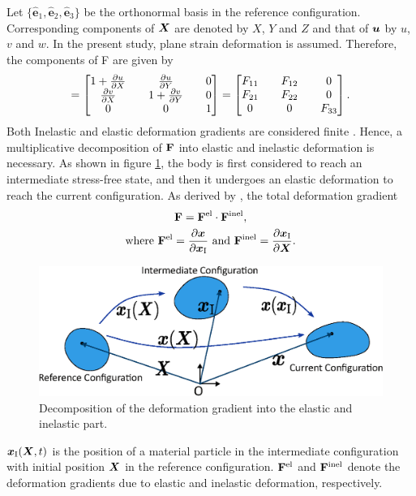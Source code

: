 Let $\{\hat{\bm{e}}_1, \hat{\bm{e}}_2, \hat{\bm{e}}_3\}$ be the orthonormal basis in the reference configuration. Corresponding components of ${\bm{X}}$ are denoted by $X$, $Y$ and $Z$ and that of ${\bm{u}}$ by $u$, $v$ and $w$. In the present study, plane strain deformation is assumed. Therefore, the components of F are given by \citep{2009ContMechLai} 
\begin{align}
[\F] = 
\begin{bmatrix}
       1 + \pdiff{u}{X} && \pdiff{u}{Y} && 0 \\
       \pdiff{v}{X} && 1 + \pdiff{v}{Y} && 0 \\
       0 && 0 && 1
\end{bmatrix} = \tensor{F}. \label{eq:F_tensor}
\end{align}
Both Inelastic and elastic deformation gradients are considered finite \citep{2011JMPSBower}. Hence, a multiplicative decomposition of $\mathbf{F}$ into elastic and inelastic deformation is necessary. As shown in figure \ref{fig:decomposition}, the body is first considered to reach an intermediate stress-free state, and then it undergoes an elastic deformation to reach the current configuration. As derived by \citet{1969Lee}, the total deformation gradient   
\begin{gather}
\mathbf{F} = \mathbf{F}^{{\rm{el}}} \cdot  \mathbf{F}^{{\rm{inel}}} \label{eq:F_decomposition}, \\
\text{where } \mathbf{F}^{{\rm{el}}} = \frac{\partial {\bm{x}}}{\partial {\bm{x}}_{\rm{I}}} \text{ and } \mathbf{F}^{{\rm{inel}}} = \frac{\partial {\bm{x}}_{{\rm{I}}}}{\partial {\bm{X}}} \nonumber.
\end{gather}
\begin{figure}[H]
    \centering
    \includegraphics[width=\textwidth]{figures/mathFormFigs/decomposition.eps}
    \caption{Decomposition of the deformation gradient into the elastic and inelastic part.}
    \label{fig:decomposition}
\end{figure}
${\bm{x}}_{\rm{I}}({\bm{X}}, t)$ is the position of a material particle in the intermediate configuration with initial position ${\bm{X}}$ in the reference configuration. $\mathbf{F}^{{\rm{el}}}$ and $\mathbf{F}^{{\rm{inel}}}$ denote the deformation gradients due to elastic and inelastic deformation, respectively.

